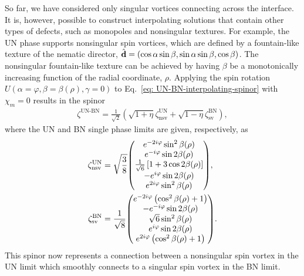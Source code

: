 So far, we have considered only singular vortices connecting across the
interface.
It is, however, possible to construct interpolating solutions that contain
other types of defects, such as monopoles and nonsingular textures.
For example, the UN phase supports nonsingular spin vortices, which are defined
by a fountain-like texture of the nematic director, \(\hat{\vb{d}} =
(\cos\alpha\sin\beta, \sin\alpha\sin\beta, \cos\beta)\).
The nonsingular fountain-like texture can be achieved by having \(\beta\) be a
monotonically increasing function of the radial coordinate, \(\rho\).
Applying the spin rotation \(U(\alpha=\varphi, \beta=\beta(\rho), \gamma=0)\) to
Eq.~\eqref{eq: UN-BN-interpolating-spinor} with \(\chi_m=0\) results in the
spinor
\begin{align}
    \zeta^\text{UN-BN}=\frac{1}{\sqrt{2}}\left(
        \sqrt{1+\eta}\zeta^\text{UN}_\text{nsv} + 
        \sqrt{1-\eta}\zeta^\text{BN}_\text{sv}
        \right),
\end{align}
where the UN and BN single phase limits are given, respectively, as
\begin{align}\label{eq: UN-general}
    \zeta^\text{UN}_\text{nsv} &= \sqrt{\frac{3}{8}}
    \mqty(
        e^{-2i\varphi}\sin^2\beta(\rho) \\
        e^{-i\varphi}\sin 2 \beta(\rho) \\
        \frac{1}{\sqrt{6}}\left[1+3\cos 2\beta(\rho)\right] \\
        -e^{i\varphi} \sin 2 \beta(\rho) \\
        e^{2i\varphi}\sin^2\beta(\rho)
    ), \\
    \zeta^\text{BN}_\text{sv} &= \frac{1}{\sqrt{8}} \label{eq: BN-general}
    \mqty(
        e^{-2i\varphi}\left(\cos^2\beta(\rho) + 1\right) \\
        - e^{-i\varphi}\sin 2 \beta(\rho) \\
        \sqrt{6}\sin^2\beta(\rho) \\
        e^{i\varphi}\sin 2 \beta(\rho) \\
        e^{2i\varphi}\left(\cos^2\beta(\rho) + 1\right)          
    ).
\end{align}
This spinor now represents a connection between a nonsingular spin vortex in the
UN limit which smoothly connects to a singular spin vortex in the BN limit.


